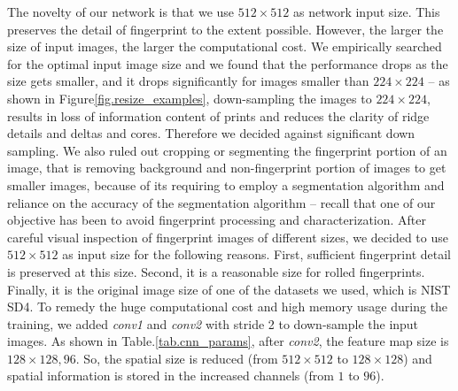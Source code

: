 The novelty of our network is that we use $512\times512$ as network input size. This preserves the detail of fingerprint to the extent possible. 
%
However, the larger the size of input images, the larger the computational cost.  We empirically searched for the optimal input image size and we found that the performance drops as the size gets smaller, and it drops significantly for images smaller than $224\times224$ -- as shown in Figure\ref{fig.resize_examples}, down-sampling the images to $224\times224$, results in loss of information content of prints and reduces the clarity of ridge details and deltas and cores. 
%
Therefore we decided against significant down sampling.  
%
We also ruled out cropping or segmenting the fingerprint portion of an image, that is removing background and non-fingerprint portion of images to get smaller images, because of its requiring to employ a segmentation algorithm and reliance on the accuracy of the segmentation algorithm -- recall that one of our objective has been to avoid fingerprint processing and characterization.
%
After careful visual inspection of fingerprint images of different sizes, we decided to use $512\times512$ as input size for the following reasons. 
%
First, sufficient fingerprint detail is preserved at this size. Second, it is a reasonable size for rolled fingerprints. Finally, it is the original image size of one of the datasets we used, which is NIST SD4. 
To remedy the huge computational cost and high memory usage during the training, we added \textit{conv1} and \textit{conv2} with stride 2 to down-sample the input images. As shown in Table.\ref{tab.cnn_params}, after \textit{conv2}, the feature map size is $128\times128, 96$. So, the spatial size is reduced (from $512 \times 512$ to $128 \times 128$) and spatial information is stored in the increased channels (from $1$ to $96$).

